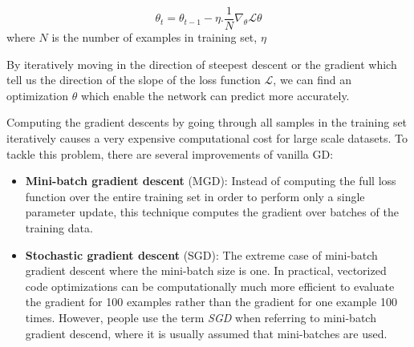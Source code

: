 \begin{equation}
    \theta_t = \theta_{t-1} - \eta . \frac{1}{N}\nabla_{\theta}\mathcal{L}\theta
\end{equation}
where $N$ is the number of examples in training set, $\eta$
\par By iteratively moving in the direction of steepest descent or the gradient which tell us the direction of the slope of the loss function  $\mathcal{L}$, we can find an optimization $\theta$ which enable the network can predict more accurately.\par
Computing the gradient descents by going through all samples in the training set iteratively causes a very expensive computational cost for large scale datasets. To tackle this problem, there are several improvements of vanilla GD:
\begin{itemize}
    \item \textbf{Mini-batch gradient descent} (MGD): Instead of computing the full loss function over the entire training set in order to perform only a single parameter update, this technique computes the gradient over batches of the training data.
    \item \textbf{Stochastic gradient descent} (SGD): The extreme case of mini-batch gradient descent where the mini-batch size is one. In practical, vectorized code optimizations can be computationally much more efficient to evaluate the gradient for 100 examples rather than the gradient for one example 100 times. However, people use the term \textit{SGD} when referring to mini-batch gradient descend, where it is usually assumed that mini-batches are used.
\end{itemize}
